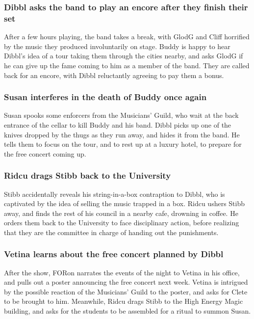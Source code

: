 \subsubsection{\Gls{Dibbl} asks the band to play an encore after they finish their set}
After a few hours playing, the band takes a break, with \Gls{GlodG} and \Gls{Cliff} horrified by
the music they produced involuntarily on stage. \Gls{Buddy} is happy to hear \Gls{Dibbl}'s idea of
a tour taking them through the cities nearby, and asks \Gls{GlodG} if he can give up the fame coming
to him as a member of the band. They are called back for an encore, with \Gls{Dibbl} reluctantly
agreeing to pay them a bonus.

\subsubsection{\Gls{Susan} interferes in the death of \Gls{Buddy} once again}
\Gls{Susan} spooks some enforcers from the Musicians' Guild, who wait at the back entrance of the
cellar to kill \Gls{Buddy} and his band. \Gls{Dibbl} picks up one of the knives dropped by the thugs
as they run away, and hides it from the band. He tells them to focus on the tour, and to rest up at
a luxury hotel, to prepare for the free concert coming up.

\subsubsection{\Gls{Ridcu} drags \Gls{Stibb} back to the University}
\Gls{Stibb} accidentally reveals his string-in-a-box contraption to \Gls{Dibbl}, who is captivated
by the idea of selling the music trapped in a box. \Gls{Ridcu} ushers \Gls{Stibb} away, and finds
the rest of his council in a nearby cafe, drowning in coffee. He orders them back to the University
to face disciplinary action, before realizing that they are the committee in charge of handing out
the punishments.

\subsubsection{\Gls{Vetina} learns about the free concert planned by \Gls{Dibbl}}
After the show, \Gls{FORon} narrates the events of the night to \Gls{Vetina} in his office, and
pulls out a poster announcing the free concert next week. \Gls{Vetina} is intrigued by the possible
reaction of the Musicians' Guild to the poster, and asks for \Gls{Clete} to be brought to him.
Meanwhile, \Gls{Ridcu} drags \Gls{Stibb} to the High Energy Magic building, and asks for the
students to be assembled for a ritual to summon \Gls{Susan}.

